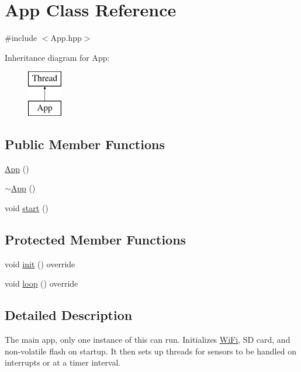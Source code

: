 \hypertarget{classApp}{}\section{App Class Reference}
\label{classApp}


{\ttfamily \#include $<$App.\+hpp$>$}

Inheritance diagram for App\+:\begin{figure}[H]
\begin{center}
\leavevmode
\includegraphics[height=2.000000cm]{classApp}
\end{center}
\end{figure}
\subsection*{Public Member Functions}
\begin{DoxyCompactItemize}
\item 
\mbox{\hyperlink{classApp_acb8cbf3e285b91d0170ffe87df5989c5}{App}} ()
\item 
\mbox{\hyperlink{classApp_a34f1f253b1cef5f4ecbac66eaf6964ec}{$\sim$\+App}} ()
\item 
void \mbox{\hyperlink{classThread_a1f53ee62bd30a7924186ef26150ce262}{start}} ()
\end{DoxyCompactItemize}
\subsection*{Protected Member Functions}
\begin{DoxyCompactItemize}
\item 
void \mbox{\hyperlink{classApp_a72d6ce9cfb7966c9e61de5e2ecae16ce}{init}} () override
\item 
void \mbox{\hyperlink{classApp_a743d0b0456b0557e1659ea950e6f17cd}{loop}} () override
\end{DoxyCompactItemize}


\subsection{Detailed Description}
The main app, only one instance of this can run. Initializes \mbox{\hyperlink{classWiFi}{Wi\+Fi}}, SD card, and non-\/volatile flash on startup. It then sets up threads for sensors to be handled on interrupts or at a timer interval. 

